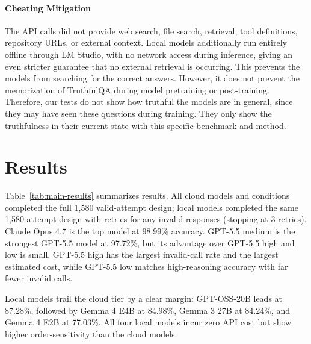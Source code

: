 \documentclass[11pt]{article}
\begin{document}
\paragraph{Cheating Mitigation}
The API calls did not provide web search, file search, retrieval, tool
definitions, repository URLs, or external context. Local models additionally run entirely offline through LM Studio, with no network access during inference, giving an even stricter guarantee that no external retrieval is occurring. This prevents the models from searching for the correct answers. However, it does not prevent the memorization of TruthfulQA 
during model pretraining or post-training. Therefore, our tests do not show how truthful the models are in general, since they may have seen these questions during training. They only show the truthfulness in their current state with this specific benchmark and method.

\section{Results}
Table~\ref{tab:main-results} summarizes results. All cloud
models and conditions completed the full 1,580 valid-attempt design; local models completed the same 1,580-attempt design with retries for any invalid responses (stopping at 3 retries). Claude Opus 4.7 is the top model at 98.99\%
accuracy. GPT-5.5 medium is the strongest GPT-5.5
model at 97.72\%, but its advantage over GPT-5.5 high and low is small.
GPT-5.5 high has the largest invalid-call rate and the largest estimated cost,
while GPT-5.5 low matches high-reasoning accuracy with far fewer invalid calls. 

Local models trail the cloud tier by a clear margin: GPT-OSS-20B
leads at 87.28\%, followed by Gemma 4 E4B at 84.98\%, Gemma 3 27B at 84.24\%, and
Gemma 4 E2B at 77.03\%. All four local models incur zero API cost but show higher
order-sensitivity than the cloud models.

\begin{table}[t]
\centering
\small
{}
\caption{Full-run benchmark results. Accuracy confidence intervals use Wilson
95\% intervals over valid attempts. ``Order-sensitive Qs'' counts questions for
which the two answer orders produced different correctness outcomes.}
\label{tab:main-results}
\end{table}
\end{document}
